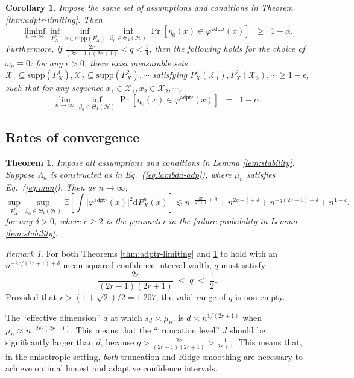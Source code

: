 \documentclass[11pt,a4paper]{article}
\theoremstyle{definition}
\theoremstyle{plain}
\newtheorem{theorem}{Theorem}[section]
\newtheorem{corollary}{Corollary}[section]
\theoremstyle{remark}
\newtheorem{remark}{Remark}[section]
\newcommand{\supp}{\mathrm{supp}}
\newcommand{\mX}{\mathcal X}
\newcommand{\ud}{\mathrm d}
\newcommand{\mH}{\mathcal H}
\newcommand{\adptr}{\mathsf{adptr}}
\begin{document}
\begin{corollary}
Impose the same set of assumptions and conditions in Theorem \ref{thm:adptr-limiting}. Then
$$
\liminf_{n\to\infty}\inf_{P_X^n}\inf_{x\in\supp(P_X^n)}\inf_{\beta_0\in\Theta_2(\mH)}\Pr[\eta_0(x)\in\varphi^\adptr(x)] \;\;\geq\;\; 1-\alpha.
$$
Furthermore, if $\frac{2r}{(2r-1)(2r+1)}<q<\frac{1}{4}$, then the following holds for the choice of $\omega_n\equiv 0$:
for any $\epsilon>0$, there exist measurable sets $\mX_1\subseteq\supp(P_X^1),\mX_2\subseteq\supp(P_X^2),\cdots$ satisfying $P_X^1(\mX_1),P_X^2(\mX_2),\cdots\geq 1-\epsilon$,
such that for any sequence $x_1\in\mX_1,x_2\in\mX_2,\cdots$, 
$$
\lim_{n\to\infty}\inf_{\beta_0\in\Theta_1(\mH)} \Pr[\eta_0(x)\in\varphi^\adptr(x)] \;\; = \;\; 1-\alpha.
$$
\label{cor:adptr}
\end{corollary}



\subsection{Rates of convergence}


\begin{theorem}
Impose all assumptions and conditions in Lemma \ref{lem:stability}. Suppose $\Lambda_n$ is constructed as in Eq.~(\ref{eq:lambda-adp}),
where $\mu_n$ satisfies Eq.~(\ref{eq:mun}). Then as $n\to\infty$, 
$$
\sup_{P_X^n}\sup_{\beta_0\in\Theta_1(\mH)}\mathbb E\left[\int \big|\varphi^\adptr(x)\big|^2\ud P_X^n(x) \right] \lesssim n^{-\frac{2r}{2r+1}+\delta} + n^{2q-\frac{3}{2}+\delta} + n^{-q(2r-1)+\delta} + n^{1-c}.
$$
for any $\delta>0$, where $c\geq 2$ is the parameter in the failure probability in Lemma \ref{lem:stability}.
\label{thm:adptr-rates}
\end{theorem}

\begin{remark}
For both Theorems \ref{thm:adptr-limiting} and \ref{thm:adptr-rates} to hold with an $n^{-2r/(2r+1)+\delta}$ mean-squared confidence interval width, $q$ must satisfy
$$
\frac{2r}{(2r-1)(2r+1)}\;<\; q\;<\; \frac{1}{2}.
$$
Provided that $r>(1+\sqrt{2})/2=1.207$, the valid range of $q$ is non-empty.
\end{remark}


The ``effective dimension'' $d$ at which $s_d\asymp \mu_n$, is $d\asymp n^{1/(2r+1)}$ when $\mu_n\approx n^{-2r/(2r+1)}$.
This means that the ``truncation level'' $J$ should be significantly larger than $d$, because $q>\frac{2r}{(2r-1)(2r+1)} > \frac{1}{2r+1}$.
This means that, in the anisotropic setting, \emph{both} truncation and Ridge smoothing are necessary to achieve optimal honest and adaptive confidence intervals.
\end{document}
